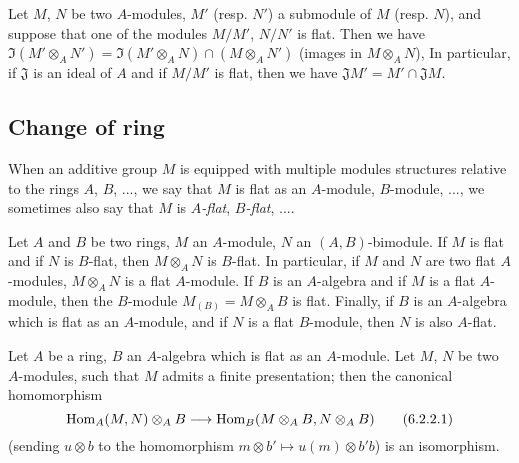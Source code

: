 \begin{env}[6.1.4]
\label{env-0.6.1.4}
Let $M$, $N$ be two $A$-modules, $M'$ (resp. $N'$) a submodule of $M$
(resp. $N$), and suppose that one of the modules $M/M'$, $N/N'$ is flat. Then we
have $\Im(M'\otimes_A N')=\Im(M'\otimes_A N)\cap(M\otimes_A N')$ (images in
$M\otimes_A N$), In particular, if $\mathfrak{J}$ is an ideal of $A$ and if
$M/M'$ is flat, then we have $\mathfrak{J}M'=M'\cap\mathfrak{J}M$.
\end{env}

\subsection{Change of ring}
\label{subsection-change-of-ring}

When an additive group $M$ is equipped with multiple modules structures relative
to the rings $A$, $B$, ..., we say that $M$ is flat as an $A$-module,
$B$-module, ..., we sometimes also say that $M$ is {\em $A$-flat},
{\em $B$-flat}, ....

\begin{env}[6.2.1]
\label{env-0.6.2.1}
Let $A$ and $B$ be two rings, $M$ an $A$-module, $N$ an $(A,B)$-bimodule. If $M$
is flat and if $N$ is $B$-flat, then $M\otimes_A N$ is $B$-flat. In particular,
if $M$ and $N$ are two flat $A$-modules, $M\otimes_A N$ is a flat $A$-module. If
$B$ is an $A$-algebra and if $M$ is
a flat $A$-module, then the $B$-module $M_{(B)}=M\otimes_A B$ is flat. Finally,
if $B$ is an $A$-algebra which is flat as an $A$-module, and if $N$ is a flat
$B$-module, then $N$ is also $A$-flat.
\end{env}

\begin{env}[6.2.2]
\label{env-0.6.2.2}
Let $A$ be a ring, $B$ an $A$-algebra which is flat as an $A$-module. Let $M$,
$N$ be two $A$-modules, such that $M$ admits a finite presentation; then the
canonical homomorphism
\[
  {\mathop{\mathrm{Hom}}\nolimits}_A(M,N)\otimes_A B\longrightarrow{\mathop{\mathrm{Hom}}\nolimits}_B(M\otimes_A B,N\otimes_A B)
  \tag{6.2.2.1}
\]
(sending $u\otimes b$ to the homomorphism $m\otimes b'\mapsto u(m)\otimes b' b$)
is an isomorphism.
\end{env}

